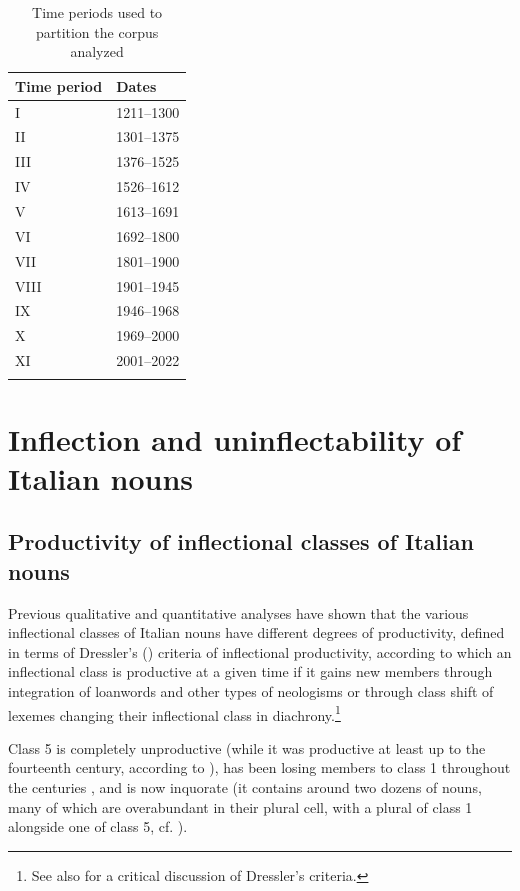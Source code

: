 \documentclass[output=paper,colorlinks,citecolor=brown]{langscibook}
\begin{document}
\begin{table}[ht]
	\centering
	\begin{tabularx}{0.4\textwidth}{XX}
		\lsptoprule
			Time period & Dates \\
			\midrule
			I & 1211–1300 \\
			II & 1301–1375 \\
			III & 1376–1525 \\
			IV & 1526–1612 \\
			V & 1613–1691 \\
			VI & 1692–1800 \\
			VII & 1801–1900 \\
			VIII & 1901–1945 \\
			IX & 1946–1968 \\
			X & 1969–2000 \\
			XI & 2001–2022 \\
		\lspbottomrule
	\end{tabularx}
	\caption{Time periods used to partition the corpus analyzed}
	\label{10tab7}
\end{table}


\section{Inflection and uninflectability of Italian nouns} \label{10sec3}

\subsection{Productivity of inflectional classes of Italian nouns} \label{10sec3.1}

{\sloppy Previous qualitative and quantitative analyses \citep{dresslerthornton1996, dachillethornton2003} have shown that the various inflectional classes of Italian nouns have different degrees of productivity, defined in terms of Dressler's (\citeyear{dressler1997, dressler2003}) criteria of inflectional productivity, according to which an inflectional class is productive at a given time if it gains new members through integration of loanwords and other types of neologisms or through class shift of lexemes changing their inflectional class in diachrony.\footnote{See also \citet{gardani2013} for a critical discussion of Dressler's criteria.}\par}

Class 5 is completely unproductive (while it was productive at least up to the fourteenth century, according to \citealt{gardani2013}), has been losing members to class 1 throughout the centuries \citep{santangelo1981}, and is now inquorate (it contains around two dozens of nouns, many of which are overabundant in their plural cell, with a plural of class 1 alongside one of class 5, cf. \citealt{thornton2010-11}).
\end{document}
